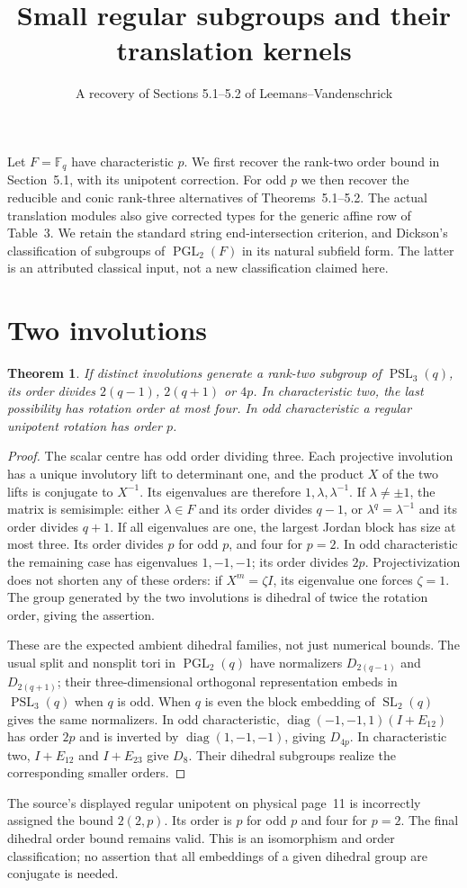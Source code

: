 \documentclass[11pt]{article}
\title{Small regular subgroups and their translation kernels}
\author{A recovery of Sections 5.1--5.2 of Leemans--Vandenschrick}\date{}
\newtheorem{theorem}{Theorem}\newtheorem{lemma}[theorem]{Lemma}
\newcommand{\F}{\mathbb F}\newcommand{\gen}[1]{\langle#1\rangle}
\newcommand{\PSL}{\operatorname{PSL}}\newcommand{\PGL}{\operatorname{PGL}}
\begin{document}
\maketitle
Let $F=\F_q$ have characteristic $p$. We first recover the rank-two
order bound in Section~5.1, with its unipotent correction. For odd $p$
we then recover the reducible and conic rank-three alternatives of
Theorems~5.1--5.2. The actual translation modules also give corrected
types for the generic affine row of Table~3.
We retain the standard string end-intersection criterion, and Dickson's
classification of subgroups of $\PGL_2(F)$ in its natural subfield
form. The latter is an attributed classical input, not a new
classification claimed here.

\section*{Two involutions}
\begin{theorem}\label{two}
If distinct involutions generate a rank-two subgroup of $\PSL_3(q)$,
its order divides $2(q-1)$, $2(q+1)$ or $4p$. In characteristic two,
the last possibility has rotation order at most four. In odd
characteristic a regular unipotent rotation has order $p$.
\end{theorem}
\begin{proof}
The scalar centre has odd order dividing three. Each projective
involution has a unique involutory lift to determinant one, and the
product $X$ of the two lifts is conjugate to $X^{-1}$. Its eigenvalues
are therefore $1,\lambda,\lambda^{-1}$. If $\lambda\ne\pm1$, the
matrix is semisimple: either $\lambda\in F$ and its order divides
$q-1$, or $\lambda^q=\lambda^{-1}$ and its order divides $q+1$.
If all eigenvalues are one, the largest Jordan block has size at most
three. Its order divides $p$ for odd $p$, and four for $p=2$.
In odd characteristic the remaining case has eigenvalues $1,-1,-1$;
its order divides $2p$. Projectivization does not shorten any of these
orders: if $X^m=\zeta I$, its eigenvalue one forces $\zeta=1$.
The group generated by the two involutions is dihedral of twice the
rotation order, giving the assertion.

These are the expected ambient dihedral families, not just numerical
bounds. The usual split and nonsplit tori in $\PGL_2(q)$ have
normalizers $D_{2(q-1)}$ and $D_{2(q+1)}$; their three-dimensional
orthogonal representation embeds in $\PSL_3(q)$ when $q$ is odd.
When $q$ is even the block embedding of $\operatorname{SL}_2(q)$
gives the same normalizers. In odd characteristic,
$\operatorname{diag}(-1,-1,1)(I+E_{12})$ has order $2p$ and is inverted
by $\operatorname{diag}(1,-1,-1)$, giving $D_{4p}$.
In characteristic two, $I+E_{12}$ and $I+E_{23}$ give $D_8$.
Their dihedral subgroups realize the corresponding smaller orders.
\end{proof}
The source's displayed regular unipotent on physical page~11 is
incorrectly assigned the bound $2(2,p)$. Its order is $p$ for odd $p$
and four for $p=2$. The final dihedral order bound remains valid.
This is an isomorphism and order classification; no assertion that all
embeddings of a given dihedral group are conjugate is needed.
\end{document}

